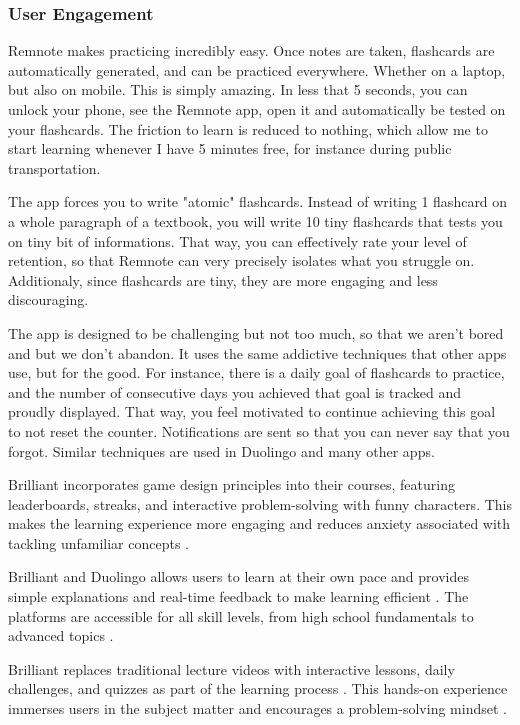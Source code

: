\documentclass{article}
\begin{document}
\subsubsection{User Engagement}

Remnote makes practicing incredibly easy. Once notes are taken, flashcards
are automatically generated, and can be practiced everywhere.
Whether on a laptop, but also on mobile. This is simply amazing.
In less that 5 seconds, you can unlock your phone, see the Remnote app,
open it and automatically be tested on your flashcards.
The friction to learn is reduced to nothing, which allow me to start
learning whenever I have 5 minutes free, for instance during public
transportation.

The app forces you to write "atomic" flashcards. Instead of writing 1
flashcard on a whole paragraph of a textbook, you will write 10 tiny
flashcards that tests you on tiny bit of informations.
That way, you can effectively rate your level of retention,
so that Remnote can very precisely isolates what you struggle on.
Additionaly, since flashcards are tiny, they are more engaging and
less discouraging.

The app is designed to be challenging but not too much, so that
we aren't bored and but we don't abandon. It uses the same addictive
techniques that other apps use, but for the good. For instance,
there is a daily goal of flashcards to practice, and the number
of consecutive days you achieved that goal is tracked and proudly
displayed. That way, you feel motivated to continue achieving this
goal to not reset the counter. Notifications are sent so that
you can never say that you forgot.  Similar techniques are used in Duolingo
and many other apps.

Brilliant incorporates game design principles into their courses,
featuring leaderboards, streaks, and interactive problem-solving
with funny characters. This makes the learning experience more
engaging and reduces anxiety associated with tackling unfamiliar
concepts \cite{fordhamram_brilliant_review}.

Brilliant and Duolingo allows users to learn at their own
pace and provides simple explanations and real-time feedback
to make learning efficient \cite{fordhamram_brilliant_review}.
The platforms are accessible for all skill levels,
from high school fundamentals to advanced topics
\cite{fordhamram_brilliant_review} .

Brilliant replaces traditional lecture videos with interactive
lessons, daily challenges, and quizzes as part of the
learning process \cite{fordhamram_brilliant_review}.
This hands-on experience immerses users in the subject matter
and encourages a problem-solving mindset
\cite{edwize_brilliant_review}.
\end{document}
